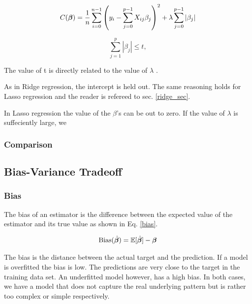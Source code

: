 \begin{equation}\label{lasso}
     C(\boldsymbol{\beta}) = \frac{1}{n} \sum_{i=0}^{n-1} \left( y_i - \sum_{j=0}^{p-1} X_{ij}\beta_j \right)^2 + \lambda\sum_{j=0}^{p-1} |\beta_j|
\end{equation}

\begin{equation}\label{lasso_constraint}
    \sum_{j=1}^p | \beta_j | \leq t, 
\end{equation}


The value of t is directly related to the value of $\lambda$ \citep[p. 68]{hastie}.


As in Ridge regression, the intercept is held out. The same reasoning holds for Lasso regression and the reader is refereed to sec. \ref{ridge_sec}.

In Lasso regression the value of the $\beta$'s can be out to zero. If the value of $\lambda$ is suffeciently large, we 


\subsubsection{Comparison}


\subsection{Bias-Variance Tradeoff}


\subsubsection{Bias}
The bias of an estimator is the difference between the expected value of the estimator and its true value as shown in Eq. \ref{bias}. 

\begin{equation}\label{bias}
    \text{Bias}(\hat{\boldsymbol{\beta}}) = \mathbb{E}[\hat{\boldsymbol{\beta}}]-\boldsymbol{\beta}
\end{equation}

The bias is the distance between the actual target and the prediction. If a model is overfitted the bias is low. The predictions are very close to the target in the training data set. An underfitted model however, has a high bias. In both cases, we have a model that does not capture the real underlying pattern but is rather too complex or simple respectively. 

